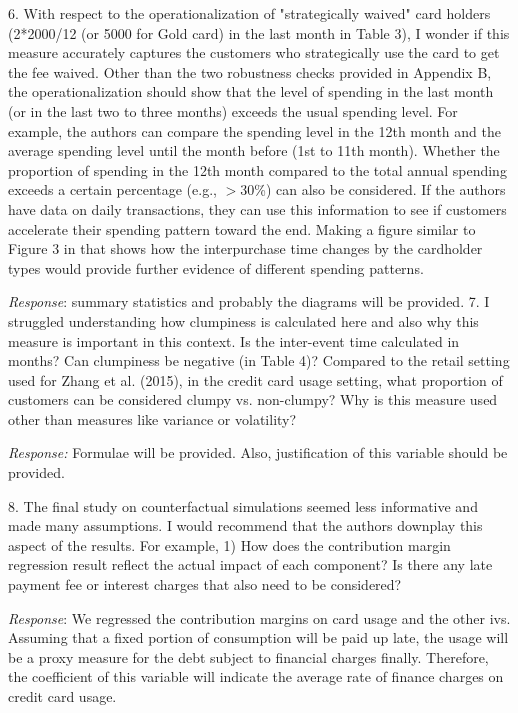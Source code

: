 \documentclass[titlepage,12pt,letterpaper]{article}
\numberwithin{equation}{section}
\begin{document}
6. 	With respect to the operationalization of "strategically waived" card holders (2*2000/12 (or 5000 for Gold card) in the last month in Table 3), I wonder if this measure accurately captures the customers who strategically use the card to get the fee waived. Other than the two robustness checks provided in Appendix B, the operationalization should show that the level of spending in the last month (or in the last two to three months) exceeds the usual spending level. For example, the authors can compare the spending level in the 12th month and the average spending level until the month before (1st to 11th month). Whether the proportion of spending in the 12th month compared to the total annual spending exceeds a certain percentage (e.g., $>$30\%) can also be considered. If the authors have data on daily transactions, they can use this information to see if customers accelerate their spending pattern toward the end. Making a figure similar to Figure 3 in \cite{DREZE2011} that shows how the interpurchase time changes by the cardholder types would provide further evidence of different spending patterns.  

\emph{Response}: summary statistics and probably the diagrams will be provided. 
7. 	I struggled understanding how clumpiness is calculated here and also why this measure is important in this context. Is the inter-event time calculated in months? Can clumpiness be negative (in Table 4)? Compared to the retail setting used for Zhang et al. (2015), in the credit card usage setting, what proportion of customers can be considered clumpy vs. non-clumpy? Why is this measure used other than measures like variance or volatility?

\emph{Response:} Formulae will be provided. Also, justification of this variable should be provided.


8. 	The final study on counterfactual simulations seemed less informative and made many assumptions. I would recommend that the authors downplay this aspect of the results. For example,
1) 	How does the contribution margin regression result reflect the actual impact of each component? Is there any late payment fee or interest charges that also need to be considered?

\emph{Response}: We regressed the contribution margins on card usage and the other ivs. Assuming that a fixed portion of consumption will be paid up late, the usage will be a proxy measure for the debt subject to financial charges finally. Therefore, the coefficient of this variable will indicate the average rate of finance charges on credit card usage. 
\end{document}
